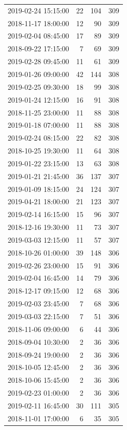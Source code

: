 \begin{tabular}{lrrr}
2019-02-24 15:15:00 & 22 & 104 & 309 \\
2018-11-17 18:00:00 & 12 & 90 & 309 \\
2019-02-04 08:45:00 & 17 & 89 & 309 \\
2018-09-22 17:15:00 & 7 & 69 & 309 \\
2019-02-28 09:45:00 & 11 & 61 & 309 \\
2019-01-26 09:00:00 & 42 & 144 & 308 \\
2019-02-25 09:30:00 & 18 & 99 & 308 \\
2019-01-24 12:15:00 & 16 & 91 & 308 \\
2018-11-25 23:00:00 & 11 & 88 & 308 \\
2019-01-18 07:00:00 & 11 & 88 & 308 \\
2019-02-24 08:15:00 & 22 & 82 & 308 \\
2018-10-25 19:30:00 & 11 & 64 & 308 \\
2019-01-22 23:15:00 & 13 & 63 & 308 \\
2019-01-21 21:45:00 & 36 & 137 & 307 \\
2019-01-09 18:15:00 & 24 & 124 & 307 \\
2019-04-21 18:00:00 & 21 & 123 & 307 \\
2019-02-14 16:15:00 & 15 & 96 & 307 \\
2018-12-16 19:30:00 & 11 & 73 & 307 \\
2019-03-03 12:15:00 & 11 & 57 & 307 \\
2018-10-26 01:00:00 & 39 & 148 & 306 \\
2019-02-26 23:00:00 & 15 & 91 & 306 \\
2019-02-04 16:45:00 & 14 & 79 & 306 \\
2018-12-17 09:15:00 & 12 & 68 & 306 \\
2019-02-03 23:45:00 & 7 & 68 & 306 \\
2019-03-03 22:15:00 & 7 & 51 & 306 \\
2018-11-06 09:00:00 & 6 & 44 & 306 \\
2018-09-04 10:30:00 & 2 & 36 & 306 \\
2018-09-24 19:00:00 & 2 & 36 & 306 \\
2018-10-05 12:45:00 & 2 & 36 & 306 \\
2018-10-06 15:45:00 & 2 & 36 & 306 \\
2019-02-23 01:00:00 & 2 & 36 & 306 \\
2019-02-11 16:45:00 & 30 & 111 & 305 \\
2018-11-01 17:00:00 & 6 & 35 & 305 \\

\end{tabular}
